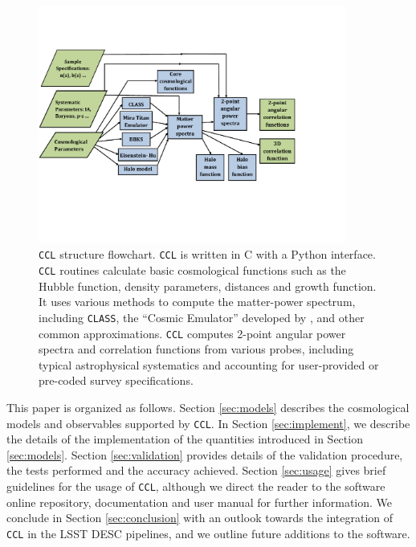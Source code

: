 \documentclass[\docopts]{\docclass}
\newcommand{\ccl}{{\tt CCL}\xspace}
\newcommand{\class}{{\tt CLASS}\xspace}
\begin{document}
\begin{figure}
\centering
\includegraphics[width=0.9\textwidth]{CCL_Flowchart5}
\caption{\ccl structure flowchart. \ccl is written in C with a Python interface. \ccl routines calculate basic cosmological functions such as the Hubble function, density parameters, distances and growth function. It uses various methods to compute the matter-power spectrum, including \class, the ``Cosmic Emulator'' developed by \citet{Lawrence17}, and other common approximations. \ccl computes 2-point angular power spectra and correlation functions from various probes, including typical astrophysical systematics and accounting for user-provided or pre-coded survey specifications.}
\label{fig:CCL_structure}
\end{figure}

This paper is organized as follows. Section \ref{sec:models} describes the cosmological models and observables supported by \ccl. In Section \ref{sec:implement}, we describe the details of the implementation of the quantities introduced in Section \ref{sec:models}. Section \ref{sec:validation} provides details of the validation procedure, the tests performed and the accuracy achieved. Section \ref{sec:usage} gives brief guidelines for the usage of \ccl, although we direct the reader to the software online repository, documentation and user manual for further information. We conclude in Section \ref{sec:conclusion} with an outlook towards the integration of \ccl in the LSST DESC pipelines, and we outline future additions to the software. 


\end{document}

